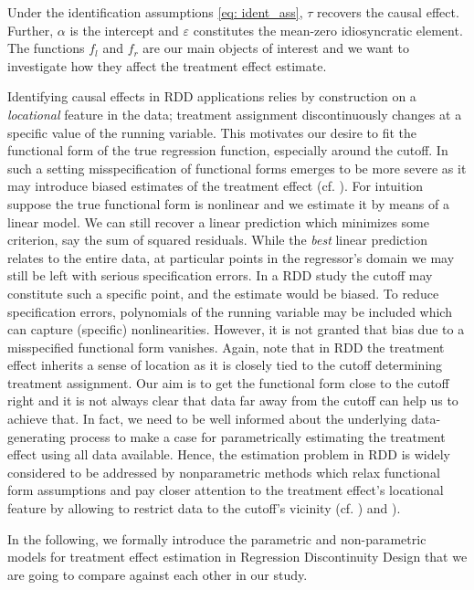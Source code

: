 \documentclass[11pt, a4paper, leqno]{article}
\numberwithin{equation}{section}
\numberwithin{figure}{section}
\numberwithin{table}{section}
\numberwithin{algorithm}{section}
\begin{document}
Under the identification assumptions \ref{eq: ident_ass}, $\tau$ recovers the causal effect. Further, $\alpha$ is the intercept and $\varepsilon$ constitutes the mean-zero idiosyncratic element. The functions $f_{l}$ and $f_{r}$ are our main objects of interest and we want to investigate how they affect the treatment effect estimate.

Identifying causal effects in RDD applications relies by construction on a \textit{locational} feature in the data; treatment assignment discontinuously changes at a specific value of the running variable. This motivates our desire to fit the functional form of the true regression function, especially around the cutoff. In such a setting misspecification of functional forms emerges to be more severe as it may introduce biased estimates of the treatment effect (cf. \cite{lee_lemieux}). For intuition suppose the true functional form is nonlinear and we estimate it by means of a linear model. We can still recover a linear prediction which minimizes some criterion, say the sum of squared residuals. While the \textit{best} linear prediction relates to the entire data, at particular points in the regressor's domain we may still be left with serious specification errors. In a RDD study the cutoff may constitute such a specific point, and the estimate would be biased. To reduce specification errors, polynomials of the running variable may be included which can capture (specific) nonlinearities. However, it is not granted that bias due to a misspecified functional form vanishes. Again, note that in RDD the treatment effect inherits a sense of location as it is closely tied to the cutoff determining treatment assignment. Our aim is to get the functional form close to the cutoff right and it is not always clear that data far away from the cutoff can help us to achieve that. In fact, we need to be well informed about the underlying data-generating process to make a case for parametrically estimating the treatment effect using all data available. Hence, the estimation problem in RDD is widely considered to be addressed by nonparametric methods which relax functional form assumptions and pay closer attention to the treatment effect's locational feature by allowing to restrict data to the cutoff's vicinity (cf. \cite{hahn_et_al}) and \cite{lee_lemieux}).

In the following, we formally introduce the parametric and non-parametric models for treatment effect estimation in Regression Discontinuity Design that we are going to compare against each other in our study.
\end{document}
